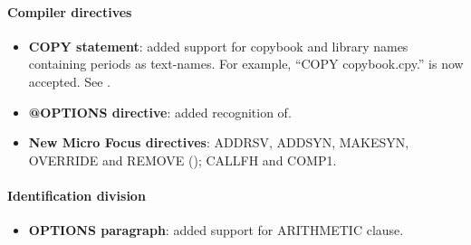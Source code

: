 \paragraph{Compiler directives}
\begin{itemize}
\item \textbf{COPY statement}: added support for copybook and library names containing periods as text-names. For example,  ``COPY copybook.cpy.'' is now accepted. See .
\item \textbf{@OPTIONS directive}: added recognition of.
\item \textbf{New Micro Focus directives}: ADDRSV, ADDSYN, MAKESYN, OVERRIDE and REMOVE (); CALLFH and COMP1.
\end{itemize}

\paragraph{Identification division}
\begin{itemize}
\item \textbf{OPTIONS paragraph}: added support for ARITHMETIC clause.
\end{itemize}

